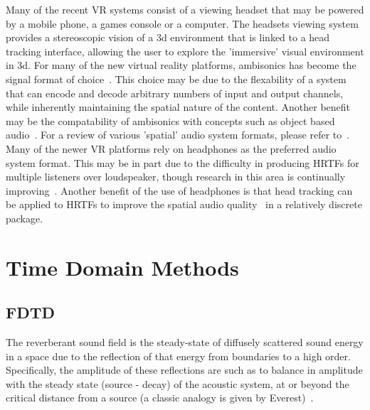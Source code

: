 \documentclass{svproc}
\begin{document}
Many of the recent VR systems consist of a viewing headset that may be powered by a mobile phone, a games console or a computer. The headsets viewing system provides a stereoscopic vision of a 3d environment that is linked to a head tracking interface, allowing the user to explore the 'immersive' visual environment in 3d. For many of the new virtual reality platforms, ambisonics has become the signal format of choice~\cite{googlevr2016}. This choice may be due to the flexability of a system that can encode and decode arbitrary numbers of input and output channels, while inherently maintaining the spatial nature of the content.
Another benefit may be the compatability of ambisonics with concepts such as object based audio~\cite{Pike2016}. For a review of various 'spatial' audio system formats, please refer to~\cite{Wiggins2004}. Many of the newer VR platforms rely on headphones as the preferred audio system format. This may be in part due to the difficulty in producing HRTFs for multiple listeners over loudspeaker, though research in this area is continually improving~\cite{Galvez2016}. Another benefit of the use of headphones is that head tracking can be applied to HRTFs to improve the spatial audio quality~\cite{Inanaga1995} in a relatively discrete package.\\



\section{Time Domain Methods}
\subsection{FDTD}

The reverberant sound field is the steady-state of diffusely scattered sound energy in a space due to the reflection of that energy from boundaries to a high order. 
Specifically, the amplitude of these reflections are such as to balance in amplitude with the steady state (source - decay) of the acoustic system, at or beyond the critical distance from a source (a classic analogy is given by Everest)~\cite{Everest2009}. 
\end{document}
